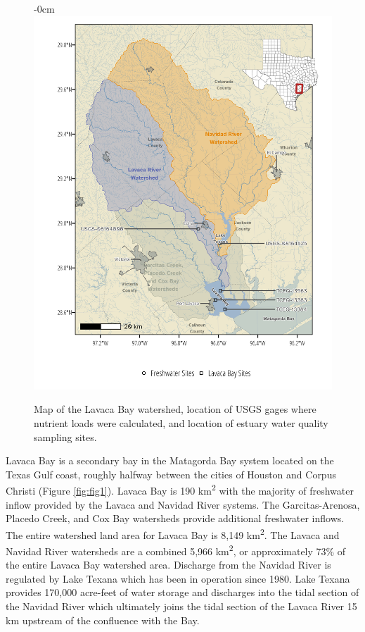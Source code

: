 \documentclass[water,article,submit,oneauthor]{Definitions/mdpi}
\begin{document}
\begin{figure}
\begin{adjustwidth}{-\extralength}{0cm}
\centering
\includegraphics[width=15.5cm]{Schramm-Manuscript-2023_files/figure-latex/fig1-1.png}
\end{adjustwidth}
\caption{Map of the Lavaca Bay watershed, location of USGS gages where nutrient loads were calculated, and location of estuary water quality sampling sites.\label{fig1}}
\end{figure}

Lavaca Bay is a secondary bay in the Matagorda Bay system located on the
Texas Gulf coast, roughly halfway between the cities of Houston and
Corpus Christi (Figure \ref{fig:fig1}). Lavaca Bay is 190
km\textsuperscript{2} with the majority of freshwater inflow provided by
the Lavaca and Navidad River systems. The Garcitas-Arenosa, Placedo
Creek, and Cox Bay watersheds provide additional freshwater inflows. The
entire watershed land area for Lavaca Bay is 8,149
km\textsuperscript{2}. The Lavaca and Navidad River watersheds are a
combined 5,966 km\textsuperscript{2}, or approximately 73\% of the
entire Lavaca Bay watershed area. Discharge from the Navidad River is
regulated by Lake Texana which has been in operation since 1980. Lake
Texana provides 170,000 acre-feet of water storage and discharges into
the tidal section of the Navidad River which ultimately joins the tidal
section of the Lavaca River 15 km upstream of the confluence with the
Bay.
\end{document}
